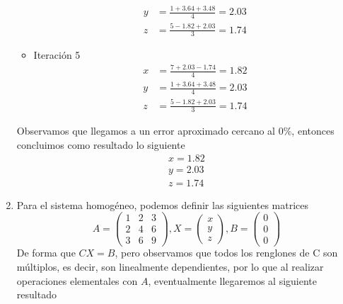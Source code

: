 \documentclass[12pt, letterpaper]{article}
\begin{document}
\begin{enumerate}
\begin{itemize}
\begin{equation*}
\begin{aligned}
                y & = \frac{1+3.64+3.48}{4} = 2.03 \\
                z & = \frac{5-1.82+2.03}{3} = 1.74
            \end{aligned}
        \end{equation*}
        \item Iteración 5
        \begin{equation*}
            \begin{aligned}
                x & = \frac{7+2.03-1.74}{4} = 1.82 \\
                y & = \frac{1+3.64+3.48}{4} = 2.03 \\
                z & = \frac{5-1.82+2.03}{3} = 1.74
            \end{aligned}
        \end{equation*}
    \end{itemize}
    Observamos que llegamos a un error aproximado cercano al $0\%$, entonces concluimos como resultado lo siguiente
    \begin{equation*}
        \begin{aligned}
            x = 1.82 \\
            y = 2.03 \\
            z = 1.74
        \end{aligned}
    \end{equation*}
    \item Para el sistema homogéneo, podemos definir las siguientes matrices
    \begin{equation*}
        A =
        \begin{pmatrix}
            1 & 2 & 3 \\
            2 & 4 & 6 \\
            3 & 6 & 9
        \end{pmatrix},
        X =
        \begin{pmatrix}
            x \\
            y \\
            z
        \end{pmatrix},
        B =
        \begin{pmatrix}
            0 \\
            0 \\
            0
        \end{pmatrix}
    \end{equation*}
    De forma que $CX = B$, pero observamos que todos los renglones de C son múltiplos, es decir, son linealmente dependientes, por lo que al realizar operaciones elementales con $A$, eventualmente llegaremos al siguiente resultado

\end{enumerate}
\end{document}
